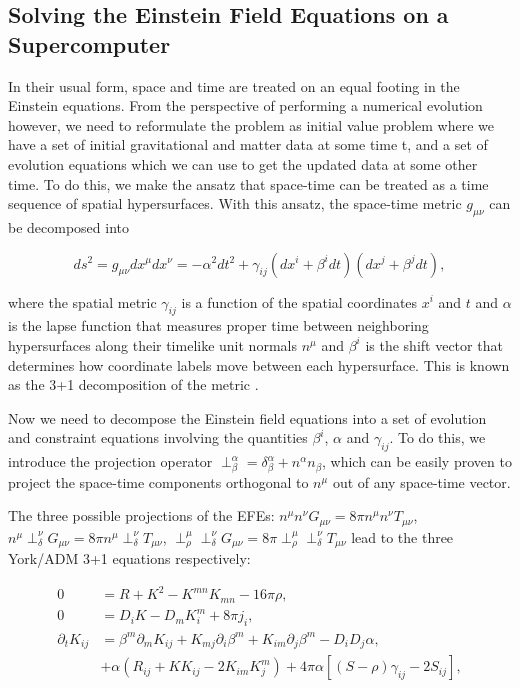 \subsection{Solving the Einstein Field Equations on a Supercomputer}

In their usual form, space and time are treated on an equal footing in the Einstein equations. From the perspective of performing a numerical evolution however, we need to reformulate the problem as initial value problem where we have a set of initial gravitational and matter data at some time t, and a set of evolution equations which we can use to get the updated data at some other time. To do this, we make the ansatz that space-time can be treated as a time sequence of spatial hypersurfaces. With this ansatz, the space-time metric $g_{\mu\nu}$ can be decomposed into

\begin{equation}
\label{eq:4}
ds^{2} = g_{\mu\nu}dx^{\mu}dx^{\nu} = -\alpha^2dt^2 + \gamma_{ij}(dx^i+\beta^idt)(dx^j+\beta^jdt),
\end{equation}

where the spatial metric $\gamma_{ij}$ is a function of the spatial coordinates $x^{i}$ and $t$ and $\alpha$ is the lapse function that measures proper time between neighboring hypersurfaces along their timelike unit normals $n^{\mu}$ and $\beta^i$ is the shift vector that determines how coordinate labels move between each hypersurface. This is known as the 3+1 decomposition of the metric \cite{arnowitt2008republication}.

Now we need to decompose the Einstein field equations into a set of evolution and constraint equations involving the quantities $\beta^i$, $\alpha$ and $\gamma_{ij}$. To do this, we introduce the projection operator $\perp^{\alpha}_{\beta} = \delta^{\alpha}_{\beta} + n^{\alpha} n_{\beta}$, which can be easily proven to project the space-time components orthogonal to $n^{\mu}$ out of any space-time vector.

The three possible projections of the EFEs: $n^{\mu} n^{\nu} G_{\mu\nu} = 8\pi n^{\mu} n^{\nu} T_{\mu\nu}$, $n^{\mu}\perp^{\nu}_{\delta}G_{\mu\nu} = 8\pi n^{\mu} \perp^{\nu}_{\delta} T_{\mu\nu}$, $\perp^{\mu}_{\rho} \perp^{\nu}_{\delta} G_{\mu\nu} = 8\pi \perp^{\mu}_{\rho} \perp^{\nu}_{\delta} T_{\mu\nu}$ lead to the three York/ADM 3+1 equations respectively:

\begin{align}
0 &= R + K^{2} - K^{mn}K_{mn} -16\pi\rho, \\
0 &= D_iK - D_mK^m_i + 8\pi j_i, \\
\partial_t K_{ij} &= \beta^m\partial_mK_{ij} + K_{mj}\partial_i\beta^m + K_{im}\partial_j\beta^m - D_iD_j\alpha, \\ 
&+ \alpha(R_{ij}+KK_{ij}-2K_{im}K^m_{j})+4\pi\alpha[(S-\rho)\gamma_{ij}-2S_{ij}],
\end{align} 

